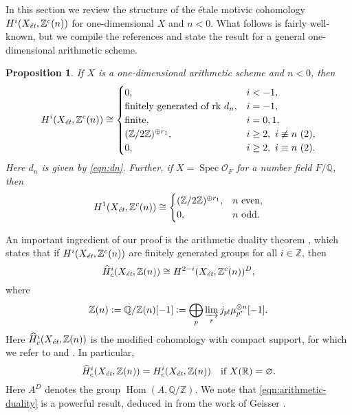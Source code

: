\documentclass[draft]{article}
\DeclareMathOperator{\Hom}{Hom}
\DeclareMathOperator{\Spec}{Spec}
\newcommand{\QQ}{\mathbb{Q}}
\newcommand{\RR}{\mathbb{R}}
\newcommand{\ZZ}{\mathbb{Z}}
\renewcommand{\emptyset}{\varnothing}
\newcommand{\et}{\text{\it \'{e}t}}
\newcommand{\dfn}{\mathrel{\mathop:}=}
\theoremstyle{myplain}
\newtheorem{proposition}[theorem]{Proposition}
\theoremstyle{mydefinition}
\begin{document}
In this section we review the structure of the \'{e}tale motivic cohomology
$H^i (X_\et, \ZZ^c(n))$ for one-dimensional $X$ and $n < 0$. What follows is
fairly well-known, but we compile the references and state the result for a
general one-dimensional arithmetic scheme.

\begin{proposition}
  \label{prop:structure-of-motivic-cohomology}
  If $X$ is a one-dimensional arithmetic scheme and $n < 0$, then
  \begin{equation}
    \label{eqn:structure-of-motivic-cohomology}
    H^i (X_\et, \ZZ^c (n)) \cong
    \begin{cases}
      0, & i < -1, \\
      \text{finitely generated of rk } d_n, & i = -1, \\
      \text{finite}, & i = 0,1, \\
      (\ZZ/2\ZZ)^{\oplus r_1}, & i \ge 2, ~ i\not\equiv n ~ (2), \\
      0, & i \ge 2, ~ i\equiv n ~ (2).
    \end{cases}
  \end{equation}
  Here $d_n$ is given by \eqref{eqn:dn}.
  Further, if $X = \Spec \mathcal{O}_F$ for a number field $F/\QQ$, then
  \begin{equation}
    \label{eqn:2-torsion-in-H1-Zc-for-Spec-OF}
    H^1 (X_\et, \ZZ^c (n)) \cong
    \begin{cases}
      (\ZZ/2\ZZ)^{\oplus r_1}, & n\text{ even}, \\
      0, & n \text{ odd}.
    \end{cases}
  \end{equation}
\end{proposition}

An important ingredient of our proof is the arithmetic duality theorem
\cite[Theorem~I]{Beshenov-Weil-etale-1}, which states that if
$H^i (X_\et, \ZZ^c (n))$ are finitely generated groups for all $i \in \ZZ$, then
\begin{equation}
  \label{eqn:arithmetic-duality}
  \widehat{H}^i_c (X_\et, \ZZ (n)) \cong
  H^{2-i} (X_\et, \ZZ^c (n))^D,
\end{equation}
where
\[ \ZZ (n) \dfn \QQ/\ZZ (n) [-1] \dfn
  \bigoplus_p \varinjlim_r j_{p!} \mu_{p^r}^{\otimes n} [-1]. \]
Here $\widehat{H}^i_c (X_\et, \ZZ (n))$ is the modified cohomology with compact
support, for which we refer to \cite[\S 2]{Geisser-Schmidt-2018} and
\cite[Appendix~B]{Beshenov-Weil-etale-1}. In particular,
\[
  \widehat{H}^i_c (X_\et, \ZZ (n)) = H^i_c (X_\et, \ZZ (n))
  \quad
  \text{if }X (\RR) = \emptyset.
\]
Here $A^D$ denotes the group $\Hom (A, \QQ/\ZZ)$. We note that
\eqref{eqn:arithmetic-duality} is a powerful result, deduced in
\cite{Beshenov-Weil-etale-1} from the work of Geisser \cite{Geisser-2010}.
\end{document}
